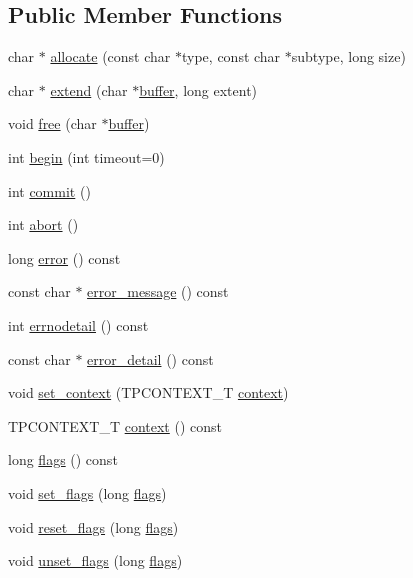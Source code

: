 \subsection*{Public Member Functions}
\begin{DoxyCompactItemize}
\item 
char $\ast$ \hyperlink{classatmi_1_1tuxedo_a44e77e3e6216a8c3fb8be33d5d8fed93}{allocate} (const char $\ast$type, const char $\ast$subtype, long size)
\item 
char $\ast$ \hyperlink{classatmi_1_1tuxedo_a683b79440474b94c471ed78ff3775eb8}{extend} (char $\ast$\hyperlink{classatmi_1_1buffer}{buffer}, long extent)
\item 
void \hyperlink{classatmi_1_1tuxedo_afdcf4b7d25862c6fdaeb47d095609a01}{free} (char $\ast$\hyperlink{classatmi_1_1buffer}{buffer})
\item 
int \hyperlink{classatmi_1_1tuxedo_ac702cf5e571a3302978bfa76cd314c9b}{begin} (int timeout=0)
\item 
int \hyperlink{classatmi_1_1tuxedo_aeff1d0270d6b12de07a4478839ec8b07}{commit} ()
\item 
int \hyperlink{classatmi_1_1tuxedo_ac5dbf9db596b4bfa05d0067b8a38e11c}{abort} ()
\item 
long \hyperlink{classatmi_1_1tuxedo_a2f5b4f52ca8095d704dcb23771425690}{error} () const 
\item 
const char $\ast$ \hyperlink{classatmi_1_1tuxedo_ad134373ac62fd2c7e1ac5482bdb7f65e}{error\+\_\+message} () const 
\item 
int \hyperlink{classatmi_1_1tuxedo_a77e2902dcd0293a2127a5d106e566a3b}{errnodetail} () const 
\item 
const char $\ast$ \hyperlink{classatmi_1_1tuxedo_ad7bf2370e3edeb091512d0b640093e9d}{error\+\_\+detail} () const 
\item 
void \hyperlink{classatmi_1_1tuxedo_afa3734356109e8c3ce4d23bfcb94242b}{set\+\_\+context} (T\+P\+C\+O\+N\+T\+E\+X\+T\+\_\+\+T \hyperlink{classatmi_1_1tuxedo_a6d31779e76609264295e0065fdfc008d}{context})
\item 
T\+P\+C\+O\+N\+T\+E\+X\+T\+\_\+\+T \hyperlink{classatmi_1_1tuxedo_a6d31779e76609264295e0065fdfc008d}{context} () const 
\item 
long \hyperlink{classatmi_1_1tuxedo_adfebbea0b6599ba8ca87743c55157b82}{flags} () const 
\item 
void \hyperlink{classatmi_1_1tuxedo_a31eb2881e3b9706c515da03728ab6875}{set\+\_\+flags} (long \hyperlink{classatmi_1_1tuxedo_adfebbea0b6599ba8ca87743c55157b82}{flags})
\item 
void \hyperlink{classatmi_1_1tuxedo_a649b28c90b5f73439e5d2ceb83a43dbd}{reset\+\_\+flags} (long \hyperlink{classatmi_1_1tuxedo_adfebbea0b6599ba8ca87743c55157b82}{flags})
\item 
void \hyperlink{classatmi_1_1tuxedo_aeef30e346c61643db72b255872729633}{unset\+\_\+flags} (long \hyperlink{classatmi_1_1tuxedo_adfebbea0b6599ba8ca87743c55157b82}{flags})
\end{DoxyCompactItemize}
